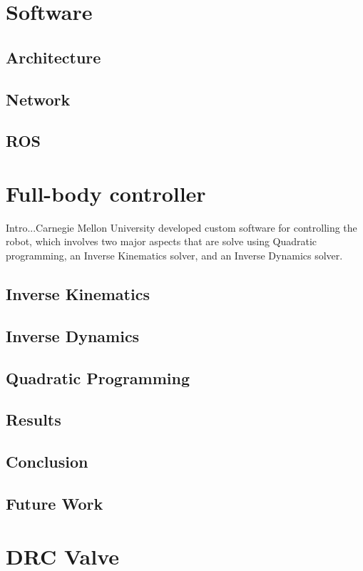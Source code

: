 \documentclass{article}
\begin{document}
\section{Software}
\subsection{Architecture}
\subsection{Network}
\subsection{ROS}

\section{Full-body controller}
Intro...Carnegie Mellon University developed custom software for controlling the robot, which involves two major aspects that are solve using Quadratic programming, an Inverse Kinematics solver, and an Inverse Dynamics solver. 
\subsection{Inverse Kinematics}

\subsection{Inverse Dynamics}

\subsection{Quadratic Programming}

\subsection{Results}

\subsection{Conclusion}

\subsection{Future Work}

\section{DRC Valve}
\end{document}
